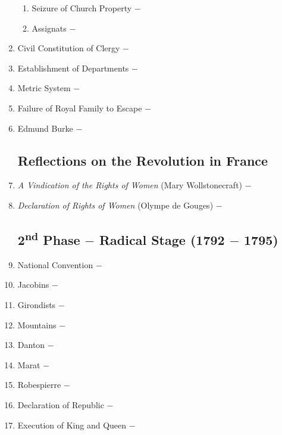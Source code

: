 \documentclass[12pt]{article}
\begin{document}
\begin{enumerate}
\begin{enumerate}[label=\arabic{*}.]
\item Seizure of Church Property $-$

\item Assignats $-$ 

\end{enumerate}
\setcounter{enumi}{313}

\item Civil Constitution of Clergy $-$ 

\item Establishment of Departments $-$ 

\item Metric System $-$ 

\item Failure of Royal Family to Escape $-$ 

\item Edmund Burke $-$

\subsection{Reflections on the Revolution in France}

\item \textit{A Vindication of the Rights of Women} (Mary Wollstonecraft) $-$

\item \textit{Declaration of Rights of Women} (Olympe de Gouges) $-$

\subsection{2\textsuperscript{nd} Phase $-$ Radical Stage (1792 $-$ 1795)}

\item National Convention $-$ 

\item Jacobins $-$ 

\item Girondists $-$ 

\item Mountains $-$ 

\item Danton $-$ 

\item Marat $-$ 

\item Robespierre $-$ 

\item Declaration of Republic $-$ 

\item Execution of King and Queen $-$ 


\end{enumerate}
\end{document}
